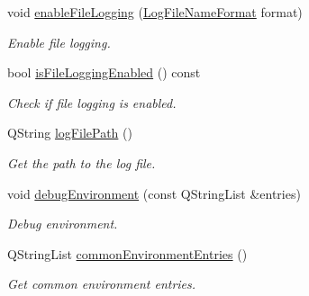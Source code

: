 \begin{DoxyCompactItemize}
\item 
void \hyperlink{class_mdt_1_1_core_application_impl_a3bd40afeeb08ddcba8cbfc78c177305b}{enable\+File\+Logging} (\hyperlink{class_mdt_1_1_core_application_impl_aa5fed8435e22870a870005ee28ff6221}{Log\+File\+Name\+Format} format)
\begin{DoxyCompactList}\small\item\em Enable file logging. \end{DoxyCompactList}\item 
bool \hyperlink{class_mdt_1_1_core_application_impl_a42a42b5d134b70a6e1c0452f29c73912}{is\+File\+Logging\+Enabled} () const 
\begin{DoxyCompactList}\small\item\em Check if file logging is enabled. \end{DoxyCompactList}\item 
Q\+String \hyperlink{class_mdt_1_1_core_application_impl_abc2b6b3ab83fdf2fd9dca1447bc82418}{log\+File\+Path} ()
\begin{DoxyCompactList}\small\item\em Get the path to the log file. \end{DoxyCompactList}\item 
void \hyperlink{class_mdt_1_1_core_application_impl_a29a336750c7ea04a570fbd769497c98f}{debug\+Environment} (const Q\+String\+List \&entries)
\begin{DoxyCompactList}\small\item\em Debug environment. \end{DoxyCompactList}\item 
Q\+String\+List \hyperlink{class_mdt_1_1_core_application_impl_abbafc463e7c820e42f967813e9e7ae7a}{common\+Environment\+Entries} ()
\begin{DoxyCompactList}\small\item\em Get common environment entries. \end{DoxyCompactList}\end{DoxyCompactItemize}
